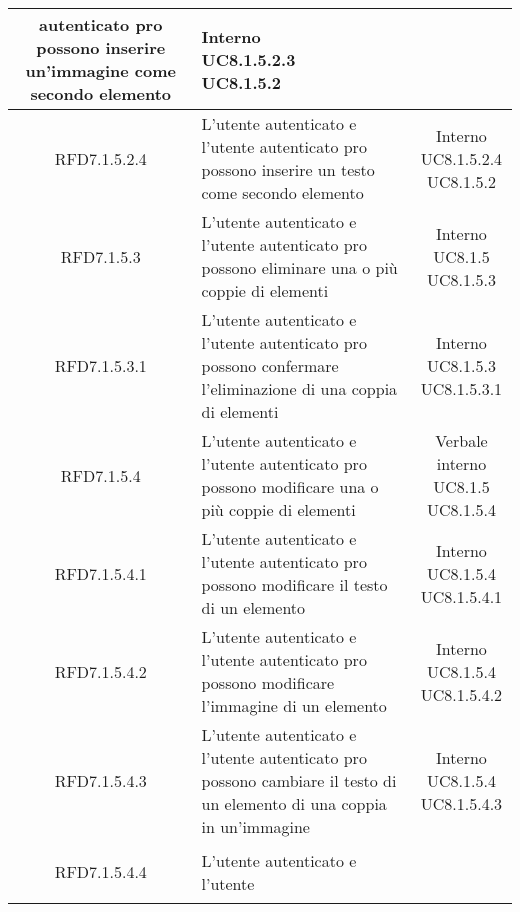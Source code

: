 \begin{longtable}{|c|>{\centering}m{7cm}|c|}
autenticato pro possono inserire
un’immagine come secondo elemento & \makecell{Interno\\ UC8.1.5.2.3 \\UC8.1.5.2 } \\ \hline
			 \hypertarget{{RFD7.1.5.2.4}}{{RFD7.1.5.2.4}} & L’utente autenticato e l’utente
autenticato pro possono inserire un testo
come secondo elemento & \makecell{Interno\\ UC8.1.5.2.4 \\UC8.1.5.2 } \\ \hline
			 \hypertarget{{RFD7.1.5.3}}{{RFD7.1.5.3}} & L’utente autenticato e l’utente
autenticato pro possono eliminare una o
più coppie di elementi & \makecell{Interno\\ UC8.1.5 \\UC8.1.5.3 } \\ \hline
			 \hypertarget{{RFD7.1.5.3.1}}{{RFD7.1.5.3.1}} & L’utente autenticato e l’utente
autenticato pro possono confermare
l’eliminazione di una coppia di elementi & \makecell{Interno\\ UC8.1.5.3 \\UC8.1.5.3.1 } \\ \hline
			 \hypertarget{{RFD7.1.5.4}}{{RFD7.1.5.4}} & L’utente autenticato e l’utente
autenticato pro possono modificare una o
più coppie di elementi & \makecell{Verbale interno\\ UC8.1.5 \\UC8.1.5.4 } \\ \hline
			 \hypertarget{{RFD7.1.5.4.1}}{{RFD7.1.5.4.1}} & L’utente autenticato e l’utente
autenticato pro possono modificare il
testo di un elemento & \makecell{Interno\\ UC8.1.5.4 \\UC8.1.5.4.1 } \\ \hline
			 \hypertarget{{RFD7.1.5.4.2}}{{RFD7.1.5.4.2}} & L’utente autenticato e l’utente
autenticato pro possono modificare
l’immagine di un elemento & \makecell{Interno\\ UC8.1.5.4 \\UC8.1.5.4.2 } \\ \hline
			 \hypertarget{{RFD7.1.5.4.3}}{{RFD7.1.5.4.3}} & L’utente autenticato e l’utente
autenticato pro possono cambiare il testo
di un elemento di una coppia in
un’immagine & \makecell{Interno\\ UC8.1.5.4 \\UC8.1.5.4.3 } \\ \hline
			 \hypertarget{{RFD7.1.5.4.4}}{{RFD7.1.5.4.4}} & L’utente autenticato e l’utente

\end{longtable}
